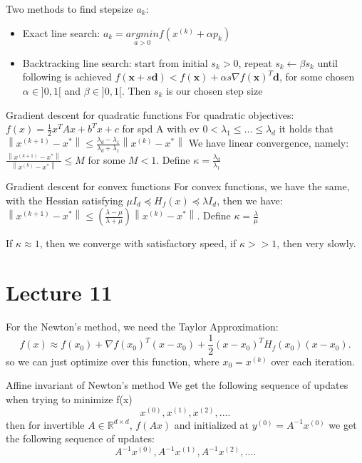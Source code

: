 \documentclass[a4paper]{article}
\begin{document}
Two methods to find stepsize $a_k$:
\begin{itemize}
    \item Exact line search: $a_k = \underset{a>0}{argmin} f(x^{(k)} + \alpha p_k)$
    \item Backtracking line search: start from initial $s_k > 0$, repeat $s_k \leftarrow \beta s_k$ until following is achieved $f(\textbf{x} + s\textbf{d}) < f(\textbf{x}) + \alpha s \nabla f(\textbf{x})^T\textbf{d}$, for some chosen $\alpha \in ]0,1[$ and $\beta \in ]0,1[$. Then $s_k$ is our chosen step size    
\end{itemize}

\begin{subbox}{Gradient descent for quadratic functions}
    For quadratic objectives: $f(x) = \frac{1}{2}x^TAx + b^Tx + c $ for spd A with ev $ 0 < \lambda_1 \leq ... \leq \lambda_d$ it holds that $\left\lVert x^{(k+1)} - x^*\right\rVert \leq \frac{\lambda_d - \lambda_1}{\lambda_d + \lambda_1}\left\lVert x^{(k)} - x^*\right\rVert $    
    We have linear convergence, namely: $\frac{\left\lVert x^{(k+1)} - x^*\right\rVert }{\left\lVert x^{(k)} - x^*\right\rVert } \leq M$ for some $M < 1$.  Define $\kappa = \frac{\lambda_d}{\lambda_1}$ 
\end{subbox}

\begin{subbox}{Gradient descent for convex functions}
    For convex functions, we have the same, with the Hessian satisfying $\mu I_d \preceq H_f(x) \preceq \lambda I_d$, then we have: \\
    $\left\lVert x^{(k+1)} - x^*\right\rVert \leq (\frac{\lambda-\mu}{\lambda + \mu}) \left\lVert x^{(k)} - x^*\right\rVert $. Define $\kappa = \frac{\lambda}{\mu}$ 
\end{subbox}
If $\kappa \approx 1$, then we converge with satisfactory speed, if $ \kappa >> 1$, then very slowly.  

\section{Lecture 11}
For the Newton's method, we need the Taylor Approximation:
\[
f(x) \approx f(x_0) + \nabla f(x_0)^T (x-x_0) + \frac{1}{2}(x-x_0)^T H_f(x_0)(x-x_0)
.\]
so we can just optimize over this function, where $x_0 = x^{(k)}$ over each iteration.

\begin{subbox}{Affine invariant of Newton's method}
    We get the following sequence of updates when trying to minimize f(x) 
    \[
    x^{(0)}, x^{(1)}, x^{(2)}, ...
    .\] then for invertible $A \in \mathbb{R}^{d\times d}$, $f(Ax)$ and initialized at $y^{(0)} = A^{-1}x^{(0)}$ we get the following sequence of updates: \[
        A^{-1}x^{(0)}, A^{-1}x^{(1)}, A^{-1}x^{(2)}, ...
    .\]   
\end{subbox}
\end{document}
